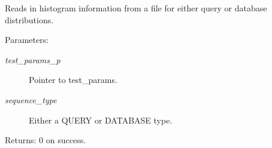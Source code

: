 Reads in histogram information from a file for either query or database distributions.

\begin{Desc}
\item[Parameters:]
\begin{description}
\item[{\em test\_\-params\_\-p}]Pointer to test\_\-params. \item[{\em sequence\_\-type}]Either a QUERY or DATABASE type. \end{description}
\end{Desc}
\begin{Desc}
\item[Returns:]0 on success. \end{Desc}
